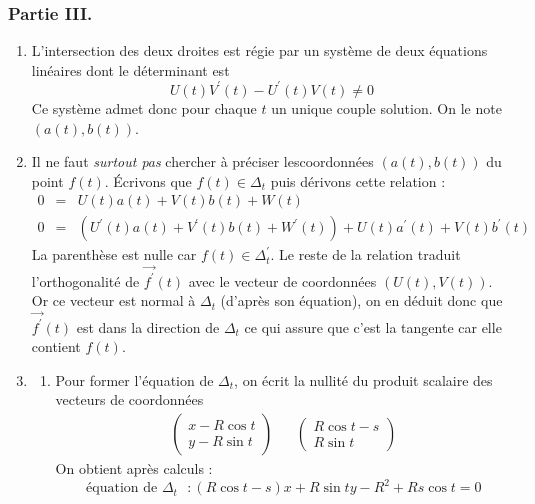 \subsubsection*{Partie III.}
\begin{enumerate}
 \item L'intersection des deux droites est régie par un système de deux équations linéaires dont le déterminant est 
\begin{displaymath}
 U(t)V^\prime(t)-U^\prime(t)V(t)\neq 0
\end{displaymath}
Ce système admet donc pour chaque $t$ un unique couple solution. On le note $(a(t),b(t))$.
\item Il ne faut \emph{surtout pas} chercher à préciser lescoordonnées $(a(t),b(t))$ du point $f(t)$.  \'Ecrivons que $f(t)\in \Delta_t$ puis dérivons cette relation :
\begin{eqnarray*}
 0&=& U(t)a(t)+V(t)b(t)+W(t) \\
0 &=& \left( U^\prime(t)a(t)+V^\prime(t)b(t)+W^\prime(t)\right)  + U(t)a^\prime(t)+V(t)b^\prime(t)
\end{eqnarray*}
La parenthèse est nulle car $f(t)\in \Delta^\prime _t$. Le reste de la relation traduit l'orthogonalité de $\overrightarrow{f^\prime}(t)$ avec le vecteur de coordonnées $(U(t),V(t))$. Or ce vecteur est normal à $\Delta_t$ (d'après son équation), on en déduit donc que $\overrightarrow{f^\prime}(t)$ est dans la direction de $\Delta_t$ ce qui assure que c'est la tangente car elle contient $f(t)$.
\item
\begin{enumerate}
 \item Pour former l'équation de $\Delta_t$, on écrit la nullité du produit scalaire des vecteurs de coordonnées
\begin{align*}
 \begin{pmatrix}
  x-R\cos t \\ y-R\sin t
 \end{pmatrix}
& &
\begin{pmatrix}
 R\cos t -s \\ R\sin t
\end{pmatrix}
\end{align*}
On obtient après calculs :
\begin{displaymath}
 \text{équation de $\Delta_t$ } : 
(R\cos t -s)x+R\sin t y -R^2+Rs\cos t =0
\end{displaymath}


\end{enumerate}
\end{enumerate}
